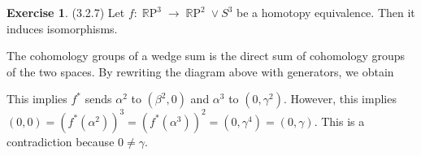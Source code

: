 \documentclass[12pt, psamsfonts]{amsart}
\theoremstyle{definition}
\newtheorem*{exer}{Exercise}
\theoremstyle{remark}
\DeclareMathOperator{\RP}{\mathbb{R}P}
\numberwithin{equation}{section}
\begin{document}
\begin{exer}{(3.2.7)}
  Let $f:\RP^3 \rightarrow \RP^2 \vee S^3$ be a homotopy equivalence.
  Then it induces isomorphisms.
  \begin{center}
  \end{center}

  The cohomology groups of a wedge sum is the direct sum of cohomology groups of the two spaces.
  By rewriting the diagram above with generators, we obtain
  \begin{center}
  \end{center}
  This implies $f^{\ast}$ sends $\alpha^2$ to $(\beta^2, 0)$ and $\alpha^3$ to $(0, \gamma^2)$.
  However, this implies $(0, 0) = (f^{\ast}(\alpha^2))^3 = (f^{\ast}(\alpha^3))^2 = (0, \gamma^4) = (0, \gamma)$.
  This is a contradiction because $0 \ne \gamma$.
\end{exer}
\end{document}
